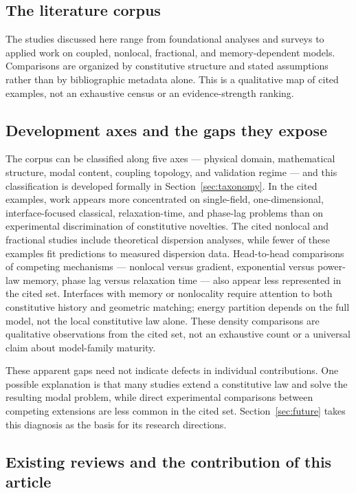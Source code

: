 \subsection{The literature corpus}

The studies discussed here range from foundational analyses and surveys to applied work on coupled, nonlocal, fractional, and memory-dependent models. Comparisons are organized by constitutive structure and stated assumptions rather than by bibliographic metadata alone. This is a qualitative map of cited examples, not an exhaustive census or an evidence-strength ranking.

\subsection{Development axes and the gaps they expose}

The corpus can be classified along five axes --- physical domain, mathematical structure, modal content, coupling topology, and validation regime --- and this classification is developed formally in Section~\ref{sec:taxonomy}. In the cited examples, work appears more concentrated on single-field, one-dimensional, interface-focused classical, relaxation-time, and phase-lag problems than on experimental discrimination of constitutive novelties. The cited nonlocal and fractional studies include theoretical dispersion analyses, while fewer of these examples fit predictions to measured dispersion data. Head-to-head comparisons of competing mechanisms --- nonlocal versus gradient, exponential versus power-law memory, phase lag versus relaxation time --- also appear less represented in the cited set. Interfaces with memory or nonlocality require attention to both constitutive history and geometric matching; energy partition depends on the full model, not the local constitutive law alone. These density comparisons are qualitative observations from the cited set, not an exhaustive count or a universal claim about model-family maturity.

These apparent gaps need not indicate defects in individual contributions. One possible explanation is that many studies extend a constitutive law and solve the resulting modal problem, while direct experimental comparisons between competing extensions are less common in the cited set. Section~\ref{sec:future} takes this diagnosis as the basis for its research directions.

\subsection{Existing reviews and the contribution of this article}

